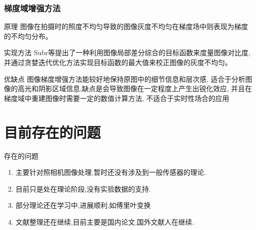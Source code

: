 \documentclass{beamer}
\begin{document}
\begin{frame}
  \frametitle{梯度域增强方法}
  \begin{block}{原理}
    图像在拍摄时的照度不均匀导致的图像灰度不均匀在梯度场中则表现为梯度的不均匀分布。
  \end{block}
  \begin{block}{实现方法}
    Subr等提出了一种利用图像局部差分综合的目标函数来度量图像对比度, 并通过贪婪迭代优化方法实现目标函数的最大值来校正图像的灰度不均匀。
  \end{block}
  \begin{block}{优缺点}
    图像梯度增强方法能较好地保持原图中的细节信息和层次感, 适合于分析图像的高光和阴影区域信息,缺点是会导致图像在一定程度上产生出锐化效应, 并且在梯度域中重建图像时需要一定的数值计算方法, 不适合于实时性场合的应用
  \end{block}
\end{frame}
\section{目前存在的问题}

\begin{frame}
  \begin{block}{存在的问题}
    \begin{enumerate}
    \item 主要针对照相机图像处理,暂时还没有涉及到一般传感器的理论.
    \item 目前只是处在理论阶段,没有实验数据的支持.
    \item 部分理论还在学习中,进展顺利,如傅里叶变换
    \item 文献整理还在继续,目前主要是国内论文,国外文献人在继续.
    \end{enumerate}
  \end{block}
\end{frame}
\end{document}
